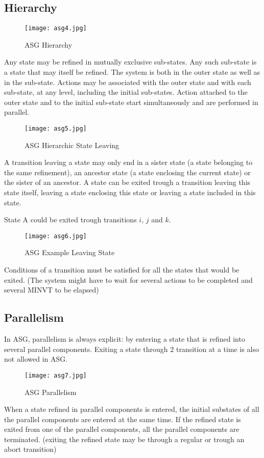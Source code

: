 \documentclass[../main.tex]{subfiles}
\begin{document}
\subsection{Hierarchy}
\begin{figure}[H]
    \centering
    \texttt{[image: asg4.jpg]}
    \caption{ASG Hierarchy}
    \label{asg4}
\end{figure}
Any state may be refined in mutually exclusive sub-states. Any such sub-state is a state that may itself be refined. The system is both in the outer state as well as in the sub-state. Actions may be associated with the outer state and with each sub-state, at any level, including the initial sub-states. Action attached to the outer state and to the initial sub-state start simultaneously and are performed in parallel.
\begin{figure}[H]
    \centering
    \texttt{[image: asg5.jpg]}
    \caption{ASG Hierarchic State Leaving}
    \label{asg5}
\end{figure}
A transition leaving a state may only end in a sister state (a state belonging to the same refinement), an ancestor state (a state enclosing the current state) or the sister of an ancestor. A state can be exited trough a transition leaving this state itself, leaving a state enclosing this state or leaving a state included in this state.
\begin{exmp}
State A could be exited trough transitions $i$, $j$ and $k$.
\begin{figure}[H]
    \centering
    \texttt{[image: asg6.jpg]}
    \caption{ASG Example Leaving State}
    \label{asg6}
\end{figure}
\end{exmp}
Conditions of a transition must be satisfied for all the states that would be exited. (The system might have to wait for several actions to be completed and several MINVT to be elapsed)

\subsection{Parallelism}
In ASG, parallelism is always explicit: by entering a state that is refined into several parallel components. Exiting a state through 2 transition at a time is also not allowed in ASG.

\begin{figure}[H]
    \centering
    \texttt{[image: asg7.jpg]}
    \caption{ASG Parallelism}
    \label{asg6}
\end{figure}
When a state refined in parallel components is entered, the initial substates of all the parallel components are entered at the same time. If the refined state is exited from one of the parallel components, all the parallel components are terminated. (exiting the refined state may be through a regular or trough an abort transition)
\end{document}
